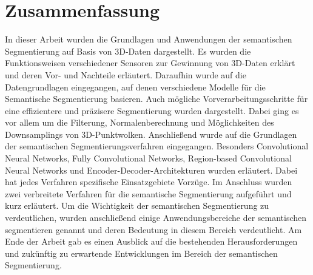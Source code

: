 \chapter{Zusammenfassung}
In dieser Arbeit wurden die Grundlagen und Anwendungen der semantischen
Segmentierung auf Basis von 3D-Daten dargestellt. Es wurden die
Funktionsweisen verschiedener Sensoren zur Gewinnung von 3D-Daten erklärt und
deren Vor- und Nachteile erläutert. Daraufhin wurde auf die Datengrundlagen
eingegangen, auf denen verschiedene Modelle für die Semantische Segmentierung
basieren. Auch mögliche Vorverarbeitungsschritte für eine effizientere und
präzisere Segmentierung wurden dargestellt. Dabei ging es vor allem um die
Filterung, Normalenberechnung und Möglichkeiten des Downsamplings von
3D-Punktwolken. Anschließend wurde auf die Grundlagen der semantischen
Segmentierungsverfahren eingegangen. Besonders Convolutional Neural Networks,
Fully Convolutional Networks, Region-based Convolutional Neural Networks
und Encoder-Decoder-Architekturen wurden erläutert. Dabei hat jedes Verfahren
spezifische Einsatzgebiete Vorzüge. Im Anschluss wurden zwei
verbreitete Verfahren für die semantische Segmentierung aufgeführt und kurz
erläutert. Um die Wichtigkeit der semantischen Segmentierung zu verdeutlichen,
wurden anschließend einige Anwendungsbereiche der semantischen segmentieren
genannt und deren Bedeutung in diesem Bereich verdeutlicht. Am Ende der Arbeit
gab es einen Ausblick auf die bestehenden Herausforderungen und zukünftig zu
erwartende Entwicklungen im Bereich der semantischen Segmentierung.